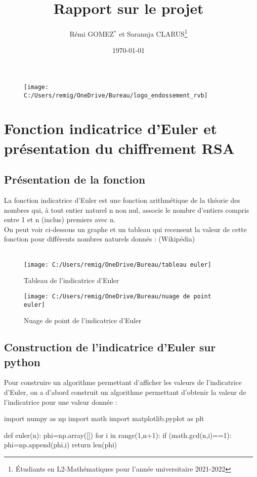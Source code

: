 \documentclass[12pt]{article}
\begin{document}
\title{\bf Rapport sur le projet}
\author{Rémi GOMEZ${}^\ast$ et Sarannja CLARUS\footnote{\'Etudiants en L2-Mathématiques pour l'année universitaire 2021-2022}}
\date{\today}
\maketitle


\begin{figure}[h]
	\texttt{[image: C:/Users/remig/OneDrive/Bureau/logo\_endossement\_rvb]}
	\centering
\end{figure}
\tableofcontents



\newpage


\section{Fonction indicatrice d'Euler et présentation du chiffrement RSA}
\subsection{Présentation de la fonction}
La fonction indicatrice d'Euler est une fonction arithmétique de la théorie des nombres qui, à tout entier naturel n non nul, associe le nombre d'entiers compris entre 1 et n (inclus) premiers avec n.
\\
On peut voir ci-dessous un graphe et un tableau qui recensent la valeur de cette fonction pour différents nombres naturels donnés : (Wikipédia)
\\
\\
\begin{figure}[h]
    \begin{minipage}[c]{.46\linewidth}
        \centering
        \texttt{[image: C:/Users/remig/OneDrive/Bureau/tableau euler]}
        \caption{Tableau de l'indicatrice d'Euler}
    \end{minipage}
    \hfill%
    \begin{minipage}[c]{.46\linewidth}
        \centering
        \texttt{[image: C:/Users/remig/OneDrive/Bureau/nuage de point euler]}
        \caption{Nuage de point de l'indicatrice d'Euler}
    \end{minipage}
\end{figure}
\newpage
\subsection{Construction de l'indicatrice d'Euler sur python}
Pour construire un algorithme permettant d'afficher les valeurs de l'indicatrice d'Euler, on a d'abord construit un algorithme permettant d'obtenir la valeur de l'indicatrice pour une valeur donnée :
\begin{python}
import numpy as np
import math
import matplotlib.pyplot as plt

def euler(n):
    phi=np.array([])
    for i in range(1,n+1):
        if (math.gcd(n,i)==1):
            phi=np.append(phi,i)
    return len(phi)
\end{python}
\end{document}
